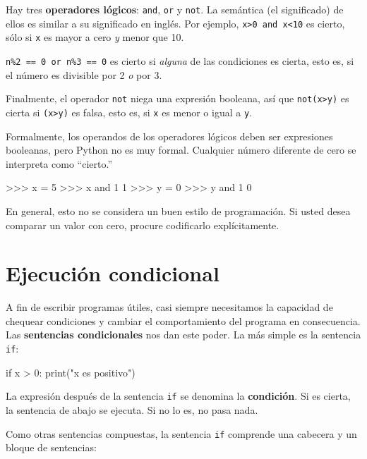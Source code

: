 Hay tres  {\bf operadores lógicos}: \texttt{and}, {\tt or} y \texttt{not}.  La 
semántica (el significado) de ellos es similar a su significado en inglés.  Por 
ejemplo, \texttt{x>0 and x<10} es cierto, sólo si  \texttt{x} es mayor a cero
{\em y} menor que 10.

\texttt{n\%2 == 0 or n\%3 == 0} es cierto si {\em alguna} de las condiciones
es cierta, esto es, si el número es divisible por 2 {\em o} por 3.

Finalmente, el operador \texttt{not} niega una expresión booleana,
así que  \texttt{not(x>y)} es cierta si \texttt{(x>y)} es falsa,
esto es, si \texttt{x} es menor o igual a \texttt{y}.

Formalmente, los operandos de los operadores lógicos deben ser
expresiones booleanas, pero Python no es muy formal. Cualquier
número diferente de cero se interpreta como ``cierto.''

\beforeverb
\begin{pyconcode}
>>>  x = 5
>>>  x and 1
1
>>>  y = 0
>>>  y and 1
0
\end{pyconcode}
\afterverb
%
En general, esto no se considera un buen estilo de programación.
Si usted desea comparar un valor con cero, procure codificarlo explícitamente.

\section{Ejecución condicional}
\label{alternative execution}

A fin de escribir programas útiles, casi siempre necesitamos la capacidad
de chequear condiciones y cambiar el comportamiento del programa en 
consecuencia. Las {\bf sentencias condicionales} nos dan este poder. La
 más simple es la sentencia \texttt{if}:

\beforeverb
\begin{pythoncode}
if x > 0:
  print("x es positivo")
\end{pythoncode}
\afterverb
%

La expresión después de la sentencia \texttt{if} se denomina
la {\bf condición}.  Si es cierta, la sentencia de abajo se
ejecuta. Si no lo es, no pasa nada.


Como otras sentencias compuestas, la sentencia \texttt{if}
comprende una cabecera y un bloque de sentencias:

